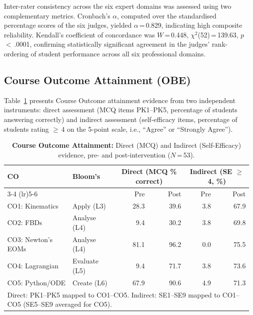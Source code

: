 \documentclass[utf8]{FrontiersinHarvard}
\begin{document}
{\color{blue} Inter-rater consistency across the six expert domains was assessed using
two complementary metrics. Cronbach's $\alpha$, computed over the
standardised percentage scores of the six judges, yielded
$\alpha$\,=\,0.829, indicating high composite reliability. Kendall's
coefficient of concordance was $W$\,=\,0.448,
$\chi^2$(52)\,=\,139.63, $p$\,$<$\,.0001, confirming statistically
significant agreement in the judges' rank-ordering of student performance
across all six professional domains.}

{\color{blue} \subsection{Course Outcome Attainment (OBE)}
\label{sec:coattainment}

Table~\ref{tab:coattain} presents Course Outcome attainment evidence from
two independent instruments: direct assessment (MCQ items PK1--PK5,
percentage of students answering correctly) and indirect assessment
(self-efficacy items, percentage of students rating $\geq$\,4 on the
5-point scale, i.e., ``Agree'' or ``Strongly Agree'').

\begin{table}[h]
\caption{\textbf{Course Outcome Attainment:} Direct (MCQ) and Indirect
(Self-Efficacy) evidence, pre- and post-intervention ($N$\,=\,53).}
\label{tab:coattain}
\begin{tabular}{llrrrr}
\toprule
\textbf{CO} & \textbf{Bloom's} &
\multicolumn{2}{c}{\textbf{Direct (MCQ \% correct)}} &
\multicolumn{2}{c}{\textbf{Indirect (SE $\geq$ 4, \%)}} \\
\cmidrule(lr){3-4} \cmidrule(lr){5-6}
 & & Pre & Post & Pre & Post \\
\midrule
CO1: Kinematics      & Apply (L3)    & 28.3 & 39.6  &  3.8 & 67.9 \\
CO2: FBDs            & Analyse (L4)  &  9.4 & 30.2  &  3.8 & 69.8 \\
CO3: Newton's EOMs   & Analyse (L4)  & 81.1 & 96.2  &  0.0 & 75.5 \\
CO4: Lagrangian      & Evaluate (L5) &  9.4 & 71.7  &  3.8 & 73.6 \\
CO5: Python/ODE      & Create (L6)   & 67.9 & 90.6  &  4.9 & 71.3 \\
\bottomrule
\multicolumn{6}{l}{\small Direct: PK1--PK5 mapped to CO1--CO5.
Indirect: SE1--SE9 mapped to CO1--CO5 (SE5--SE9 averaged for CO5).}
\end{tabular}
\end{table}

}
\end{document}
